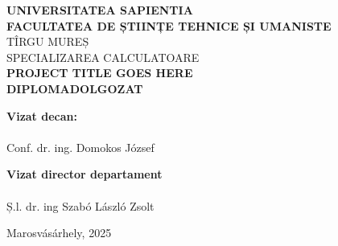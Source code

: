\begin{titlepage}
    \centering
    \vspace*{2cm}

    {\Large \textbf{UNIVERSITATEA SAPIENTIA}}\\[0.2cm]
    {\Large \textbf{FACULTATEA DE ȘTIINȚE TEHNICE ȘI UMANISTE}}\\[0.5cm]
    {\large TÎRGU MUREȘ}\\[0.2cm]
    {\large  SPECIALIZAREA CALCULATOARE}\\[3cm]

    {\LARGE \textbf{PROJECT TITLE GOES HERE}}\\[0.5cm] 
    {\Large \textbf{DIPLOMADOLGOZAT}}\\[4cm]

    \begin{flushleft}
        \begin{minipage}{0.45\textwidth}
            \textbf{Vizat decan:}\\
            \\
            Conf. dr. ing. Domokos József\\
        \end{minipage}
        \hfill
        \begin{minipage}{0.45\textwidth}
            \textbf{Vizat director departament }\\
            \\
            Ș.l. dr. ing   Szabó László Zsolt
        \end{minipage}
    \end{flushleft}

    \vfill

    {\large Marosvásárhely, 2025}

\end{titlepage}
